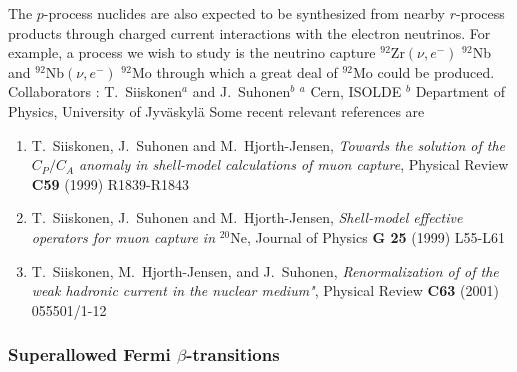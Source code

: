 The $p$-process nuclides are also expected to be synthesized
from nearby $r$-process products through charged current
interactions with the electron neutrinos. For example,
a process we wish to study is the neutrino capture
$^{92}$Zr$(\nu , e^{-})$ $^{92}$Nb and 
$^{92}$Nb$(\nu , e^{-})$ $^{92}$Mo
through which a great deal of $^{92}$Mo could be produced.
\newline
\newline
Collaborators : T.\ Siiskonen$^a$ 
and J.\ Suhonen$^b$\newline
${}^a$ Cern, ISOLDE\newline
${}^b$ Department of Physics,
University of Jyv\"askyl\"a\newline\newline
Some recent relevant references are
\begin{enumerate}
\item T.\ Siiskonen, J.\ Suhonen and M.\ Hjorth-Jensen, {\em  
      Towards the solution of the $C_{P}/C_{A}$ anomaly in shell-model 
      calculations of muon capture}, Physical Review {\bf C59} (1999) 
      R1839-R1843
\item T.\ Siiskonen, J.\ Suhonen and M.\ Hjorth-Jensen, {\em  
      Shell-model effective operators for muon capture in} $^{20}$Ne,
      Journal of Physics {\bf G 25} (1999) L55-L61
\item T.\ Siiskonen, M.~Hjorth-Jensen, and J.\ Suhonen, {\em Renormalization of of the weak hadronic
current in the nuclear medium"}, 
Physical Review {\bf C63} (2001) 055501/1-12
\end{enumerate}


\subsubsection*{Superallowed  Fermi $\beta$-transitions}

